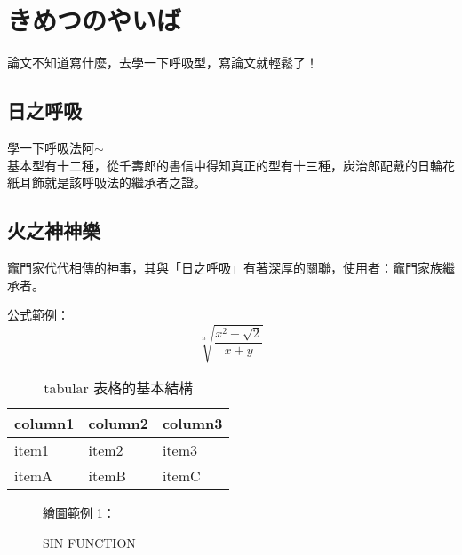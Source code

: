 \chapter{きめつのやいば}\label{structure}

論文不知道寫什麼，去學一下呼吸型，寫論文就輕鬆了！

\section{日之呼吸}
學一下呼吸法阿$\sim$ \\
基本型有十二種，從千壽郎的書信中得知真正的型有十三種，炭治郎配戴的日輪花紙耳飾就是該呼吸法的繼承者之證。

\section{火之神神樂}
竈門家代代相傳的神事，其與「日之呼吸」有著深厚的關聯，使用者：竈門家族繼承者。

公式範例：
\begin{equation}
   \sqrt[n]{\frac{x^2+\sqrt 2}{x+y}}
\end{equation}
\vspace*{3em}
\begin{table}[h]
   \centering
   \caption{tabular 表格的基本結構}\label{booktabs_1}
		\begin{tabular}[t]{lll}
		\hline
		column1 & column2 & column3 \\
		\hline
		item1   & item2   & item3 \\
		itemA   & itemB   & itemC \\
		\hline
		\end{tabular}
\end{table}


\begin{figure}
繪圖範例 1：\\[1em]
   \centering
      \pgfplotsset{width=6cm}          %
   \caption{SIN FUNCTION}\label{fig:SIN FUNCTION}
\end{figure}

